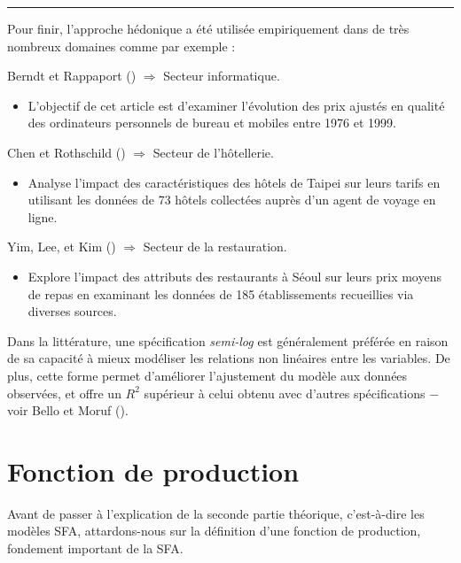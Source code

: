 \documentclass[
  12pt,
]{report}
\providecommand{\tightlist}{%
  \setlength{\itemsep}{0pt}\setlength{\parskip}{0pt}}\usepackage{longtable,booktabs,array}
\begin{document}
\begin{center}\rule{0.5\linewidth}{0.5pt}\end{center}

Pour finir, l'approche hédonique a été utilisée empiriquement dans de
très nombreux domaines comme par exemple :

Berndt et Rappaport () \(\Rightarrow\)
Secteur informatique.

\begin{itemize}
\tightlist
\item
  L'objectif de cet article est d'examiner l'évolution des prix ajustés
  en qualité des ordinateurs personnels de bureau et mobiles entre 1976
  et 1999.
\end{itemize}

Chen et Rothschild () \(\Rightarrow\)
Secteur de l'hôtellerie.

\begin{itemize}
\tightlist
\item
  Analyse l'impact des caractéristiques des hôtels de Taipei sur leurs
  tarifs en utilisant les données de 73 hôtels collectées auprès d'un
  agent de voyage en ligne.
\end{itemize}

Yim, Lee, et Kim () \(\Rightarrow\) Secteur
de la restauration.

\begin{itemize}
\tightlist
\item
  Explore l'impact des attributs des restaurants à Séoul sur leurs prix
  moyens de repas en examinant les données de 185 établissements
  recueillies via diverses sources.
\end{itemize}

Dans la littérature, une spécification \emph{semi-log} est généralement
préférée en raison de sa capacité à mieux modéliser les relations non
linéaires entre les variables. De plus, cette forme permet d'améliorer
l'ajustement du modèle aux données observées, et offre un \(R^2\)
supérieur à celui obtenu avec d'autres spécifications \(-\) voir Bello
et Moruf ().

\newpage

\section{Fonction de production}\label{fonction-de-production}

Avant de passer à l'explication de la seconde partie théorique,
c'est-à-dire les modèles SFA, attardons-nous sur la définition d'une
fonction de production, fondement important de la SFA.
\end{document}
